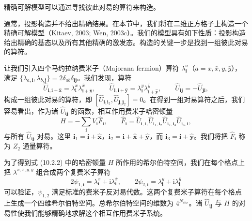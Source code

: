 \begin{keypoints}
\item 精确可解模型可以通过寻找彼此对易的算符来构造。
\end{keypoints}

通常，投影构造并不给出精确结果。在本节中，我们将在二维正方格子上构造一个精确可解模型（Kitaev, 2003; Wen, 2003c）。我们的模型具有如下性质：投影构造给出精确的基态以及所有其他精确的激发态。构造的关键一步是找到一组彼此对易的算符。

让我们引入四个马约拉纳费米子（Majorana fermion）算符 $\lambda_{\pmb{i}}^{a}$（$a=x,\bar{x},y,\bar{y}$），满足 $\{\lambda_{a,\pmb{i}},\lambda_{b,\pmb{j}}\}=2\delta_{ab}\delta_{\pmb{i}\pmb{j}}$。我们发现，算符
\begin{equation*}
\hat U_{\pmb{i},\pmb{i}+\hat{\pmb{x}}}=\lambda_{\pmb{i}}^{x}\lambda_{\pmb{i}+\hat{\pmb{x}}}^{\bar{x}},\qquad
\hat U_{\pmb{i},\pmb{i}+\hat{\pmb{y}}}=\lambda_{\pmb{i}}^{y}\lambda_{\pmb{i}+\hat{\pmb{y}}}^{\bar{y}},\qquad
\hat U_{\pmb{i}\pmb{j}}=-\hat U_{\pmb{j}\pmb{i}},
\tag{10.2.1}
\end{equation*}
构成一组彼此对易的算符，即 $[\hat U_{\pmb{i}_1\pmb{i}_2},\hat U_{\pmb{j}_1\pmb{j}_2}]=0$。在得到一组对易算符之后，我们容易看出，作为诸 $\hat U_{\pmb{i}\pmb{j}}$ 的函数，相互作用费米子哈密顿量
\begin{equation*}
H=-\sum_{\pmb{i}}V_{\pmb{i}}\hat F_{\pmb{i}},\qquad
\hat F_{\pmb{i}}=\hat U_{\pmb{i},\pmb{i}_1}\hat U_{\pmb{i}_1,\pmb{i}_2}\hat U_{\pmb{i}_2,\pmb{i}_3}\hat U_{\pmb{i}_3,\pmb{i}},
\tag{10.2.2}
\end{equation*}
与所有 $\hat U_{\pmb{i}\pmb{j}}$ 对易。这里 $\pmb{i}_1=\pmb{i}+\hat{\pmb{x}}$，$\pmb{i}_2=\pmb{i}+\hat{\pmb{x}}+\hat{\pmb{y}}$，而 $\pmb{i}_3=\pmb{i}+\hat{\pmb{y}}$。我们将把 $\hat F_{\pmb{i}}$ 称为 $Z_2$ 通量算符。

为了得到式 (10.2.2) 中的哈密顿量 $H$ 所作用的希尔伯特空间，我们在每个格点上把 $\lambda^{x,\bar{x},y,\bar{y}}$ 组合成两个复费米子算符
\begin{equation*}
2\psi_{1,\pmb{i}}=\lambda_{\pmb{i}}^{x}+\mathrm{i}\lambda_{\pmb{i}}^{\bar{x}},\qquad
2\psi_{2,\pmb{i}}=\lambda_{\pmb{i}}^{y}+\mathrm{i}\lambda_{\pmb{i}}^{\bar{y}}
\tag{10.2.3}
\end{equation*}
可以验证，$\psi_{1,2}$ 满足标准的费米子反对易代数。这两个复费米子算符在每个格点上生成一个四维希尔伯特空间。总希尔伯特空间的维数为 $4^{N_{\text{site}}}$。诸 $\hat U_{\pmb{i}\pmb{j}}$ 与 $H$ 的对易性使我们能够精确地求解这个相互作用费米子系统。

